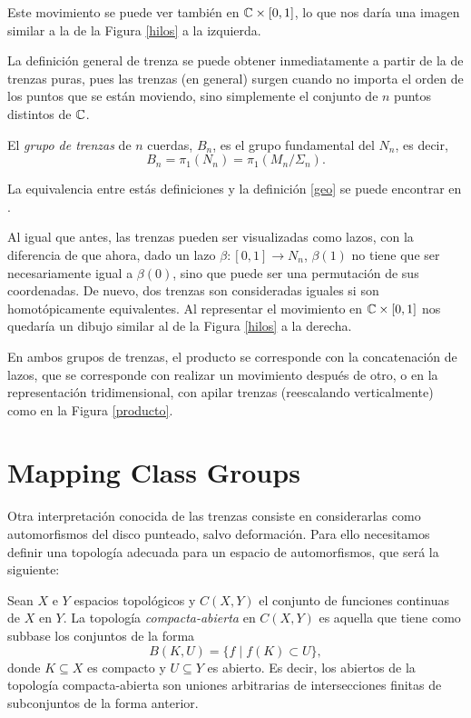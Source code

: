 \documentclass[TFG.tex]{subfiles}
\begin{document}
Este movimiento se puede ver también en $\mathbb{C}\times[0,1]$, lo que nos daría una imagen similar a la de la Figura \ref{hilos} a la izquierda.

La definición general de trenza se puede obtener inmediatamente a partir de la de trenzas puras, pues las trenzas (en general) surgen cuando no importa el orden de los puntos que se están moviendo, sino simplemente el conjunto de $n$ puntos distintos de $\mathbb{C}$.

\begin{defi}
El \emph{grupo de trenzas} de $n$ cuerdas, $B_n$,  es el grupo fundamental del $N_n$, es decir,
$$B_n=\pi_1(N_n)=\pi_1(M_n/\Sigma_n).$$
\end{defi}

La equivalencia entre estás definiciones y la definición \ref{geo} se puede encontrar en \cite{Zariski}.

Al igual que antes, las trenzas pueden ser visualizadas como lazos, con la diferencia de que ahora, dado un lazo $\beta:[0,1]\to N_n$, $\beta(1)$ no tiene que ser necesariamente igual a $\beta(0)$, sino que puede ser una permutación de sus coordenadas. De nuevo, dos trenzas son consideradas iguales si son homotópicamente equivalentes. Al representar el movimiento en $\mathbb{C}\times[0,1]$ nos quedaría un dibujo similar al de la Figura \ref{hilos} a la derecha.

En ambos grupos de trenzas, el producto se corresponde con la concatenación de lazos, que se corresponde con realizar un movimiento después de otro, o en la representación tridimensional, con apilar trenzas (reescalando verticalmente) como en la Figura \ref{producto}. 




\section{Mapping Class Groups}

Otra interpretación conocida de las trenzas consiste en considerarlas como automorfismos del disco punteado, salvo deformación. Para ello necesitamos definir una topología adecuada para un espacio de automorfismos, que será la siguiente:

\begin{defi}
Sean $X$ e $Y$ espacios topológicos y $C(X,Y)$ el conjunto de funciones continuas de $X$ en $Y$. La topología \emph{compacta-abierta} en $C(X,Y)$ es aquella que tiene como subbase los conjuntos de la forma
$$B(K,U)=\{f\mid f(K)\subset U\},$$
donde $K\subseteq X$ es compacto y $U\subseteq Y$ es abierto. Es decir, los abiertos de la topología compacta-abierta son uniones arbitrarias de intersecciones finitas de subconjuntos de la forma anterior.
\end{defi}
\end{document}
